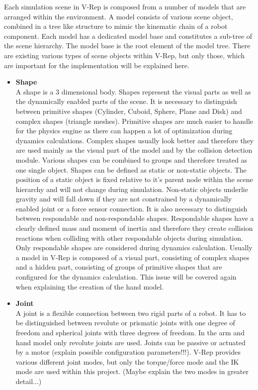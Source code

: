 Each simulation scene in V-Rep is composed from a number of models that are arranged within the environment. A model consists of various scene object, combined in a tree like structure to mimic the kinematic chain of a robot component. Each model has a dedicated model base and constitutes a sub-tree of the scene hierarchy. The model base is the root element of the model tree. There are existing various types of scene objects within V-Rep, but only those, which are important for the implementation will be explained here.

\begin{itemize}
\item \textbf{Shape} \\
A shape is a 3 dimensional body. Shapes represent the visual parts as well as the dynamically enabled parts of the scene. It is necessary to distinguish between primitive shapes (Cylinder, Cuboid, Sphere, Plane and Disk) and complex shapes (triangle meshes). Primitive shapes are much easier to handle for the physics engine as there can happen a lot of optimization during dynamics calculations. Complex shapes usually look better and therefore they are used mainly as the visual part of the model and by the collision detection module. Various shapes can be combined to groups and therefore treated as one single object. Shapes can be defined as static or non-static objects. The position of a static object is fixed relative to it's parent node within the scene hierarchy and will not change during simulation. Non-static objects underlie gravity and will fall down if they are not constrained by a dynamically enabled joint or a force sensor connection. It is also necessary to distinguish between respondable and non-respondable shapes. Respondable shapes have a clearly defined mass and moment of inertia and therefore they create collision reactions when colliding with other respondable objects during simulation. Only respondable shapes are considered during dynamics calculation. Usually a model in V-Rep is composed of a visual part, consisting of complex shapes and a hidden part, consisting of groups of primitive shapes that are configured for the dynamics calculation. This issue will be covered again when explaining the creation of the hand model.

\item \textbf{Joint} \\
A joint is a flexible connection between two rigid parts of a robot. It has to be distinguished between revolute or prismatic joints with one degree of freedom and spherical joints with three degrees of freedom. In the arm and hand model only revolute joints are used. Joints can be passive or actuated by a motor (explain possible configuration parameters!!!). V-Rep provides various different joint modes, but only the torque/force mode and the IK mode are used within this project. (Maybe explain the two modes in greater detail...)


\end{itemize}
